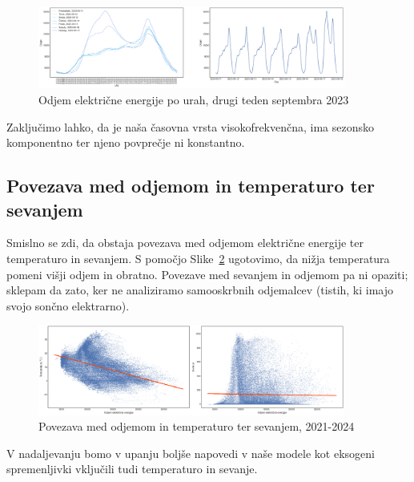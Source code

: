 \documentclass[a4paper, 11pt]{article}
\begin{document}
\begin{figure}[h!]
    \centering
    \caption{Odjem električne energije po urah, drugi teden septembra 2023}\par\medskip
    \label{fig:odjem_teden}
    \includegraphics[width=0.9\textwidth]{odjem_teden.png}
\end{figure}

\noindent Zaključimo lahko, da je naša časovna vrsta visokofrekvenčna, ima sezonsko komponentno ter njeno povprečje ni konstantno.


\subsection{Povezava med odjemom in temperaturo ter sevanjem}

\noindent Smislno se zdi, da obstaja povezava med odjemom električne energije ter
temperaturo in sevanjem. S pomočjo Slike~\ref{fig:temp_sevanje} ugotovimo, da
nižja temperatura pomeni višji odjem in obratno. 
Povezave med sevanjem in odjemom pa ni opaziti; sklepam da zato, ker 
ne analiziramo samooskrbnih odjemalcev (tistih, ki imajo svojo sončno elektrarno). 

\begin{figure}[h!]
    \centering
    \caption{Povezava med odjemom in temperaturo ter sevanjem, 2021-2024}\par\medskip
    \label{fig:temp_sevanje}
    \includegraphics[width=0.9\textwidth]{temp_sevanje.png}
\end{figure}

\noindent V nadaljevanju bomo v upanju boljše napovedi v naše modele kot 
eksogeni spremenljivki vključili tudi temperaturo in sevanje. 
\end{document}
